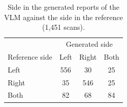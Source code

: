 \begin{table}[!htbp]
\caption{Side in the generated reports of the VLM against the side in the reference (1,451 scans).}
\label{tab:sideconf}
\centering
\footnotesize
\begin{tabular}{@{}lccc@{}}
\toprule
 & \multicolumn{3}{c}{Generated side} \\
Reference side & Left & Right & Both \\
\midrule
Left & 556 & 30 & 25 \\
Right & 35 & 546 & 25 \\
Both & 82 & 68 & 84 \\
\bottomrule
\end{tabular}
\end{table}

